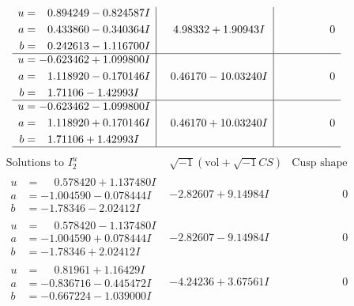 \documentclass[1p]{elsarticle_modified}
\theoremstyle{definition}
\newcommand{\I}{\sqrt{-1}}
\begin{document}
$$\begin{array}{c|c|c}
\begin{aligned}
u &= \phantom{-}0.894249 - 0.824587 I \\
a &= \phantom{-}0.433860 - 0.340364 I \\
b &= \phantom{-}0.242613 - 1.116700 I\end{aligned}
 & \phantom{-}4.98332 + 1.90943 I & \phantom{-0.000000 } 0 \\ \hline\begin{aligned}
u &= -0.623462 + 1.099800 I \\
a &= \phantom{-}1.118920 - 0.170146 I \\
b &= \phantom{-}1.71106 - 1.42993 I\end{aligned}
 & \phantom{-}0.46170 - 10.03240 I & \phantom{-0.000000 } 0 \\ \hline\begin{aligned}
u &= -0.623462 - 1.099800 I \\
a &= \phantom{-}1.118920 + 0.170146 I \\
b &= \phantom{-}1.71106 + 1.42993 I\end{aligned}
 & \phantom{-}0.46170 + 10.03240 I & \phantom{-0.000000 } 0\\
 \hline 
 \end{array}$$\newpage$$\begin{array}{c|c|c}  
\text{Solutions to }I^u_{2}& \I (\text{vol} + \sqrt{-1}CS) & \text{Cusp shape}\\
 \hline 
\begin{aligned}
u &= \phantom{-}0.578420 + 1.137480 I \\
a &= -1.004590 - 0.078444 I \\
b &= -1.78346 - 2.02412 I\end{aligned}
 & -2.82607 + 9.14984 I & \phantom{-0.000000 } 0 \\ \hline\begin{aligned}
u &= \phantom{-}0.578420 - 1.137480 I \\
a &= -1.004590 + 0.078444 I \\
b &= -1.78346 + 2.02412 I\end{aligned}
 & -2.82607 - 9.14984 I & \phantom{-0.000000 } 0 \\ \hline\begin{aligned}
u &= \phantom{-}0.81961 + 1.16429 I \\
a &= -0.836716 - 0.445472 I \\
b &= -0.667224 - 1.039000 I\end{aligned}
 & -4.24236 + 3.67561 I & \phantom{-0.000000 } 0 \\ \hline\begin{aligned}

\end{aligned}
\end{array}$$
\end{document}
